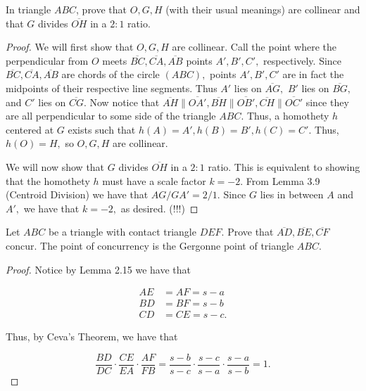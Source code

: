 \documentclass[letterpaper,oneside]{scrartcl}
\begin{document}
  \begin{lemma*}
    In triangle $ABC$, prove that $O, G, H$ (with their usual meanings) are collinear and that $G$ divides $\overline{OH}$ in a $2:1$ ratio.
  \end{lemma*}

 \begin{proof}  We will first show that $O,G,H$ are collinear. Call the point where the perpendicular from $O$ meets $\overline{BC},\overline{CA}, \overline{AB}$ points $A',B',C',$ respectively. Since $\overline{BC},\overline{CA}, \overline{AB}$ are chords of the circle $(ABC),$ points $A',B',C'$ are in fact the midpoints of their respective line segments. Thus $A'$ lies on $\overline{AG},$ $B'$ lies on $\overline{BG},$ and $C'$ lies on $\overline{CG}.$ Now notice that $\overline{AH} \parallel \overline{OA'}, \overline{BH} \parallel \overline{OB'}, \overline{CH} \parallel \overline{OC'}$ since they are all perpendicular to some side of the triangle $ABC.$  Thus, a homothety $h$ centered at $G$ exists such that $h(A) = A', h(B) = B', h(C) = C'.$ Thus, $h(O) = H,$ so $O,G,H$ are collinear. 

We will now show that $G$ divides $\overline{OH}$ in a $2:1$ ratio. This is equivalent to showing that the homothety $h$ must have a scale factor $k = -2.$ From Lemma 3.9 (Centroid Division) we have that $AG/GA' = 2/1.$ Since $G$ lies in between $A$ and $A',$ we have that $k=-2,$ as desired. (!!!) \end{proof}



\begin{problem*}
  [3.16]
  Let $ABC$ be a triangle with contact triangle $DEF$. Prove that $\overline{AD}, \overline{BE}, \overline{CF}$ concur. The point of concurrency is the Gergonne point of triangle $ABC$.
\end{problem*}

\begin{proof}
  Notice by Lemma 2.15 we have that 

\begin{align*}
AE &= AF = s-a\\
BD &= BF = s-b\\
CD &= CE = s-c.
\end{align*}

Thus, by Ceva's Theorem, we have that

$$\frac{BD}{DC}\cdot\frac{CE}{EA}\cdot\frac{AF}{FB} = \frac{s-b}{s-c}\cdot\frac{s-c}{s-a}\cdot\frac{s-a}{s-b} =1.$$
\end{proof}
\end{document}
